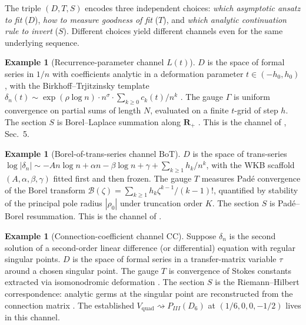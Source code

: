 \documentclass[11pt,reqno]{amsart}
\theoremstyle{plain}
\theoremstyle{definition}
\newtheorem{example}[theorem]{Example}
\theoremstyle{remark}
\newcommand{\Lt}{L(t)}
\newcommand{\BoT}{\mathrm{BoT}}
\newcommand{\CC}{\mathrm{CC}}
\newcommand{\Vquad}{V_{\mathrm{quad}}}
\newcommand{\dn}{\delta_{n}}
\newcommand{\Borel}{\mathcal{B}}
\begin{document}
The triple $(D,T,S)$ encodes three independent choices:
\emph{which asymptotic ansatz to fit} ($D$),
\emph{how to measure goodness of fit} ($T$), and
\emph{which analytic continuation rule to invert} ($S$).
Different choices yield different channels even for the same
underlying sequence.

\begin{example}[Recurrence-parameter channel $\Lt$]
\label{ex:lt}
$D$ is the space of formal series in $1/n$ with coefficients
analytic in a deformation parameter $t \in (-h_0, h_0)$, with
the Birkhoff--Trjitzinsky template
$\dn(t) \sim \exp(\rho \log n) \cdot n^\sigma \cdot
\sum_{k \ge 0} c_k(t)/n^k$
\cite{birkhofftrjitzinsky1932analytic, wimp1984computation}.
The gauge $\Gamma$ is uniform convergence on partial sums of
length $N$, evaluated on a finite $t$-grid of step $h$. The
section $S$ is Borel--Laplace summation along $\mathbf{R}_+$
\cite{costin2008asymptotics}. This is the channel of
\cite{siarc_pcf1_v13}, Sec.~5.
\end{example}

\begin{example}[Borel-of-trans-series channel $\BoT$]
\label{ex:bot}
$D$ is the space of trans-series
$\log|\dn| \sim -A n \log n + \alpha n - \beta \log n
+ \gamma + \sum_{k \ge 1} h_k / n^k$,
with the WKB scaffold $(A,\alpha,\beta,\gamma)$ fitted first
and then frozen. The gauge $T$ measures Pad\'e convergence
of the Borel transform
$\Borel(\zeta) = \sum_{k \ge 1} h_k \zeta^{k-1}/(k-1)!$,
quantified by stability of the principal pole radius
$|\rho_0|$ under truncation order $K$. The section $S$ is
Pad\'e--Borel resummation. This is the channel of
\cite{siarc_borel_5x, siarc_borel_kscan}.
\end{example}

\begin{example}[Connection-coefficient channel $\CC$]
\label{ex:cc}
Suppose $\dn$ is the second solution of a second-order linear
difference (or differential) equation with regular singular
points. $D$ is the space of formal series in a transfer-matrix
variable $\tau$ around a chosen singular point. The gauge
$T$ is convergence of Stokes constants extracted via
isomonodromic deformation \cite{jimbomiwa1981monodromy}. The
section $S$ is the Riemann--Hilbert correspondence:
analytic germs at the singular point are reconstructed from
the connection matrix
\cite{lodayrichaud2016divergent, boalch2001stokes}. The
established $\Vquad \rightsquigarrow P_{III}(D_6)$ at
$(1/6,0,0,-1/2)$ \cite{iwasaki1991from, ohyama2006studies}
lives in this channel.
\end{example}
\end{document}
